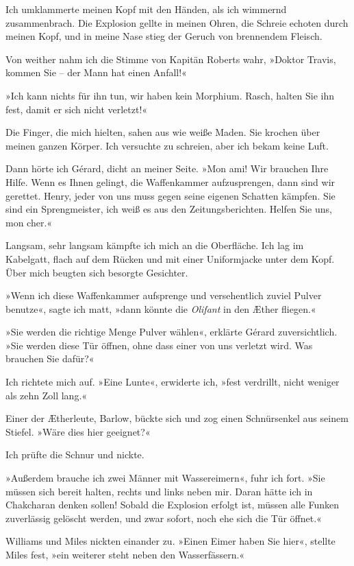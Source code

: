 Ich umklammerte meinen Kopf mit den Händen, als ich wimmernd
zusammenbrach. Die Explosion gellte in meinen Ohren, die Schreie
echoten durch meinen Kopf, und in meine Nase stieg der Geruch von
brennendem Fleisch.

Von weither nahm ich die Stimme von Kapitän Roberts wahr, »Doktor
Travis, kommen Sie – der Mann hat einen Anfall!«

»Ich kann nichts für ihn tun, wir haben kein Morphium. Rasch,
halten Sie ihn fest, damit er sich nicht verletzt!«

Die Finger, die mich hielten, sahen aus wie weiße Maden. Sie
krochen über meinen ganzen Körper. Ich versuchte zu schreien, aber
ich bekam keine Luft.

Dann hörte ich Gérard, dicht an meiner Seite. »Mon ami! Wir
brauchen Ihre Hilfe. Wenn es Ihnen gelingt, die Waffenkammer
aufzusprengen, dann sind wir gerettet. Henry, jeder von uns muss
gegen seine eigenen Schatten kämpfen. Sie sind ein Sprengmeister,
ich weiß es aus den Zeitungsberichten. Helfen Sie uns, mon cher.«

Langsam, sehr langsam kämpfte ich mich an die Oberfläche. Ich lag
im Kabelgatt, flach auf dem Rücken und mit einer Uniformjacke unter
dem Kopf. Über mich beugten sich besorgte Gesichter.

»Wenn ich diese Waffenkammer aufsprenge und versehentlich zuviel
Pulver benutze«, sagte ich matt, »dann könnte die \emph{Olifant} in
den Æther fliegen.«

»Sie werden die richtige Menge Pulver wählen«, erklärte Gérard
zuversichtlich. »Sie werden diese Tür öffnen, ohne dass einer von
uns verletzt wird. Was brauchen Sie dafür?«

Ich richtete mich auf. »Eine Lunte«, erwiderte ich, »fest
verdrillt, nicht weniger als zehn Zoll lang.«

Einer der Ætherleute, Barlow, bückte sich und zog einen
Schnürsenkel aus seinem Stiefel. »Wäre dies hier geeignet?«

Ich prüfte die Schnur und nickte.

»Außerdem brauche ich zwei Männer mit Wassereimern«, fuhr ich fort.
»Sie müssen sich bereit halten, rechts und links neben mir. Daran
hätte ich in Chakcharan denken sollen! Sobald die Explosion erfolgt
ist, müssen alle Funken zuverlässig gelöscht werden, und zwar
sofort, noch ehe sich die Tür öffnet.«

Williams und Miles nickten einander zu. »Einen Eimer haben Sie
hier«, stellte Miles fest, »ein weiterer steht neben den
Wasserfässern.«

